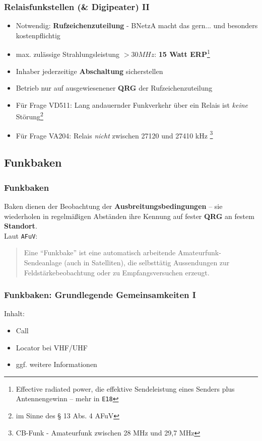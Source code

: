 \begin{frame}
    \frametitle{Relaisfunkstellen (\& Digipeater) II}

    \begin{itemize}[<+->]
        \item Notwendig: \textbf{Rufzeichenzuteilung} - BNetzA macht das gern...
              und besonders kostenpflichtig
        \item max. zulässige Strahlungsleistung $>30 MHz$: \textbf{15 Watt
              ERP}\footnote{Effective radiated power, die effektive
              Sendeleistung eines Senders plus Antennengewinn -- mehr in
              \texttt{E18}}
        \item Inhaber jederzeitige \textbf{Abschaltung} sicherstellen
        \item Betrieb nur auf ausgewiesenener \textbf{QRG} der Rufzeichenzuteilung
        \item Für Frage VD511: Lang andauernder Funkverkehr über ein Relais
              ist \emph{keine} Störung\footnote{im Sinne des § 13 Abs. 4 AFuV}
        \item Für Frage VA204: Relais \emph{nicht} zwischen 27120 und 27410 kHz
              \footnote{CB-Funk - Amateurfunk zwischen 28 MHz und 29,7 MHz}
    \end{itemize}

\end{frame}

\subsection{Funkbaken}

\begin{frame}
    \frametitle{Funkbaken}

    Baken dienen der Beobachtung der \textbf{Ausbreitungsbedingungen} -- sie
    wiederholen in regelmäßigen Abständen ihre Kennung auf fester \textbf{QRG}
    an festem \textbf{Standort}. \\[2em]

    Laut \texttt{AFuV}: 
    \begin{quote}
      Eine ``Funkbake'' ist eine automatisch arbeitende Amateurfunk-Sendeanlage
      (auch in Satelliten), die selbsttätig Aussendungen zur
      Feldstärkebeobachtung oder zu Empfangsversuchen erzeugt.
    \end{quote}

\end{frame}

\begin{frame}
    \frametitle{Funkbaken: Grundlegende Gemeinsamkeiten I}

    Inhalt:
    
    \begin{itemize}
        \item Call
        \item Locator bei VHF/UHF
        \item ggf. weitere Informationen
    \end{itemize}

\end{frame}

